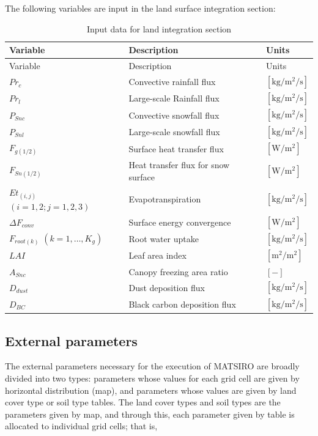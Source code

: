 The following variables are input in the land surface integration section:

\begin{longtable}[]{@{}lll@{}}
\caption{Input data for land integration section}\tabularnewline
\toprule\noalign{}
Variable & Description & Units \\
\midrule\noalign{}
\endfirsthead
\toprule\noalign{}
Variable & Description & Units \\
\midrule\noalign{}
\endhead
\bottomrule\noalign{}
\endlastfoot
\(Pr_{c}\) & Convective rainfall flux & \(\mathrm{[kg/m^2/s]}\) \\
\(Pr_{l}\) & Large-scale Rainfall flux & \(\mathrm{[kg/m^2/s]}\) \\
\(P_{Snc}\) & Convective snowfall flux & \(\mathrm{[kg/m^2/s]}\) \\
\(P_{Snl}\) & Large-scale snowfall flux & \(\mathrm{[kg/m^2/s]}\) \\
\(F_{g(1/2)}\) & Surface heat transfer flux & \(\mathrm{[W/m^2]}\) \\
\(F_{Sn(1/2)}\) & Heat transfer flux for snow surface & \(\mathrm{[W/m^2]}\) \\
\(Et_{(i,j)}\) \((i=1,2;j=1,2,3)\) & Evapotranspiration & \(\mathrm{[kg/m^2/s]}\) \\
\(\Delta F_{conv}\) & Surface energy convergence & \(\mathrm{[W/m^2]}\) \\
\(F_{root(k)}\) \((k=1,\ldots,K_g)\) & Root water uptake & \(\mathrm{[kg/m^2/s]}\) \\
\(LAI\) & Leaf area index & \(\mathrm{[m^2/m^2]}\) \\
\(A_{Snc}\) & Canopy freezing area ratio & \(\mathrm{[-]}\) \\
\(D_{dust}\) & Dust deposition flux & \(\mathrm{[kg/m^2/s]}\) \\
\(D_{BC}\) & Black carbon deposition flux & \(\mathrm{[kg/m^2/s]}\) \\
\end{longtable}

\subsection{External parameters}\label{external-parameters}

The external parameters necessary for the execution of MATSIRO are broadly divided into two types: parameters whose values for each grid cell are given by horizontal distribution (map), and parameters
whose values are given by land cover type or soil type tables. The land cover types and soil types are the parameters given by map, and through this, each parameter given by table is allocated to
individual grid cells; that is,

